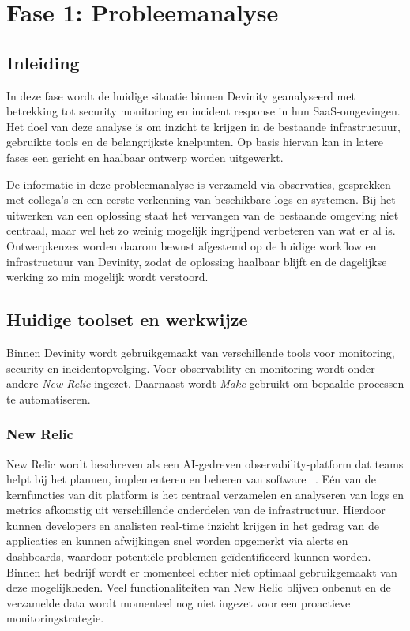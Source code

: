 \chapter{Fase 1: Probleemanalyse}%
\label{ch:probleemanalyse}

\section{Inleiding}
In deze fase wordt de huidige situatie binnen Devinity geanalyseerd met betrekking tot security monitoring en incident response in hun SaaS-omgevingen. Het doel van deze analyse is om inzicht te krijgen in de bestaande infrastructuur, gebruikte tools en de belangrijkste knelpunten. Op basis hiervan kan in latere fases een gericht en haalbaar ontwerp worden uitgewerkt.

De informatie in deze probleemanalyse is verzameld via observaties, gesprekken met collega's en een eerste verkenning van beschikbare logs en systemen. Bij het uitwerken van een oplossing staat het vervangen van de bestaande omgeving niet centraal, maar wel het zo weinig mogelijk ingrijpend verbeteren van wat er al is. Ontwerpkeuzes worden daarom bewust afgestemd op de huidige workflow en infrastructuur van Devinity, zodat de oplossing haalbaar blijft en de dagelijkse werking zo min mogelijk wordt verstoord.

\newpage


\section{Huidige toolset en werkwijze}
Binnen Devinity wordt gebruikgemaakt van verschillende tools voor monitoring, security en incidentopvolging. Voor observability en monitoring wordt onder andere \textit{New Relic} ingezet. Daarnaast wordt \textit{Make} gebruikt om bepaalde processen te automatiseren. 

\subsection{New Relic}
New Relic wordt beschreven als een AI-gedreven observability-platform dat teams helpt bij het plannen, implementeren en beheren van software ~\autocite{newrelic_observability}. Eén van de kernfuncties van dit platform is het centraal verzamelen en analyseren van logs en metrics afkomstig uit verschillende onderdelen van de infrastructuur. Hierdoor kunnen developers en analisten real-time inzicht krijgen in het gedrag van de applicaties en kunnen afwijkingen snel worden opgemerkt via alerts en dashboards, waardoor potentiële problemen geïdentificeerd kunnen worden. Binnen het bedrijf wordt er momenteel echter niet optimaal gebruikgemaakt van deze mogelijkheden. Veel functionaliteiten van New Relic blijven onbenut en de verzamelde data wordt momenteel nog niet ingezet voor een proactieve monitoringstrategie.

